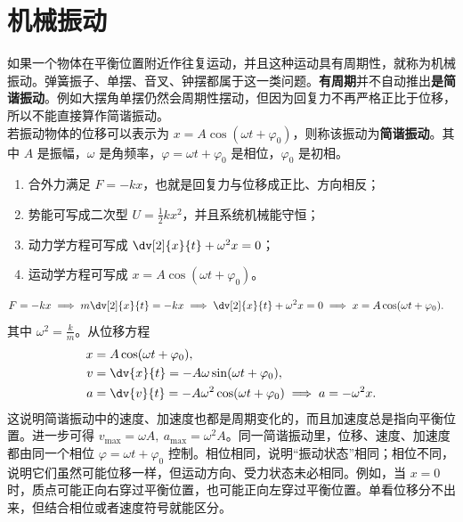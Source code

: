 

\chapter{机械振动}

\begin{definition}
如果一个物体在平衡位置附近作往复运动，并且这种运动具有周期性，就称为机械振动。弹簧振子、单摆、音叉、钟摆都属于这一类问题。\textbf{有周期}并不自动推出\textbf{是简谐振动}。例如大摆角单摆仍然会周期性摆动，但因为回复力不再严格正比于位移，所以不能直接算作简谐振动。\\若振动物体的位移可以表示为 \(x=A\cos(\omega t+\varphi_0)\)，则称该振动为\textbf{简谐振动}。其中 \(A\) 是振幅，\(\omega\) 是角频率，\(\varphi=\omega t+\varphi_0\) 是相位，\(\varphi_0\) 是初相。
\begin{enumerate}
 \item 合外力满足 \(F=-kx\)，也就是回复力与位移成正比、方向相反；
 \item 势能可写成二次型 \(U=\frac{1}{2}kx^2\)，并且系统机械能守恒；
 \item 动力学方程可写成 \(\dv[2]{x}{t}+\omega^2x=0\)；
 \item 运动学方程可写成 \(x=A\cos(\omega t+\varphi_0)\)。
\end{enumerate}
\begin{align*}
F=-kx &\implies m\dv[2]{x}{t}=-kx\implies \dv[2]{x}{t}+\omega^2x=0\implies x=A\cos(\omega t+\varphi_0).
\end{align*}
其中 \(\omega^2=\frac{k}{m}\)。从位移方程
\[
\begin{aligned}
x&=A\cos(\omega t+\varphi_0),\\
v&=\dv{x}{t}=-A\omega\sin(\omega t+\varphi_0),\\
a&=\dv{v}{t}=-A\omega^2\cos(\omega t+\varphi_0)
\implies a=-\omega^2x.
\end{aligned}
\]
这说明简谐振动中的速度、加速度也都是周期变化的，而且加速度总是指向平衡位置。进一步可得 \(v_{\max}=\omega A,\ a_{\max}=\omega^2A\)。同一简谐振动里，位移、速度、加速度都由同一个相位 \(\varphi=\omega t+\varphi_0\) 控制。相位相同，说明“振动状态”相同；相位不同，说明它们虽然可能位移一样，但运动方向、受力状态未必相同。例如，当 \(x=0\) 时，质点可能正向右穿过平衡位置，也可能正向左穿过平衡位置。单看位移分不出来，但结合相位或者速度符号就能区分。
\end{definition}
